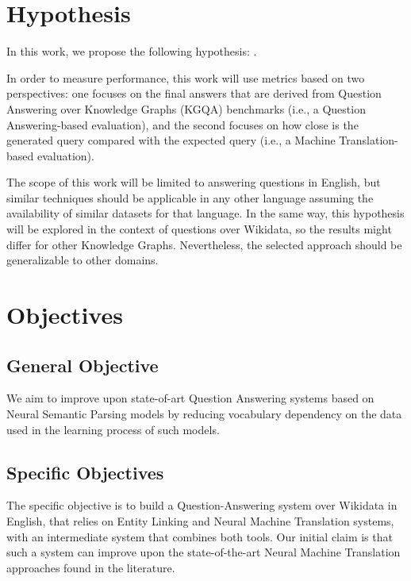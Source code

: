 \section{Hypothesis}
In this work, we propose the following hypothesis: .

In order to measure performance, this work will use metrics based on two perspectives: 
one focuses on the final answers that are derived from Question Answering over Knowledge 
Graphs (KGQA) benchmarks (i.e., a Question Answering-based evaluation), and the second 
focuses on how close is the generated \SPARQL{} query compared with the expected query (i.e., 
a Machine Translation-based evaluation).

The scope of this work will be limited to answering questions in English, but similar 
techniques should be applicable in any other language assuming the availability of similar 
datasets for that language. In the same way, this hypothesis will be explored in the context of 
questions over Wikidata, so the results might differ for other Knowledge Graphs. Nevertheless, 
the selected approach should be generalizable to other domains. 

\section{Objectives}
\subsection*{General Objective}
We aim to improve upon state-of-art Question Answering systems 
based on Neural Semantic Parsing models by reducing vocabulary dependency on the 
data used in the learning process of such models.
\subsection*{Specific Objectives}
The specific objective is to build a Question-Answering system over Wikidata in English, 
that relies on Entity Linking and Neural Machine Translation systems, with an intermediate 
system that combines both tools. Our initial claim is that such a system can improve upon 
the state-of-the-art Neural Machine Translation approaches found in the literature.  

